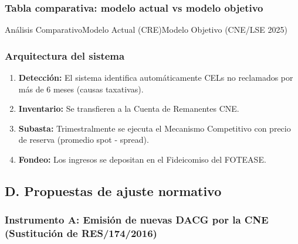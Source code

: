 \documentclass{cel}
\begin{document}
\subsubsection{Tabla comparativa: modelo actual vs modelo objetivo}
\nopagebreak

\vspace{0.3cm}
\begin{tablaParadigmaV2}{Análisis Comparativo}{Modelo Actual (CRE)}{Modelo Objetivo (CNE/LSE 2025)}
\end{tablaParadigmaV2}

\subsubsection{Arquitectura del sistema}
\nopagebreak

\begin{enumerate}
\item \textbf{Detección:} El sistema identifica automáticamente CELs no reclamados por más de 6 meses (causas taxativas).
\item \textbf{Inventario:} Se transfieren a la \textquotedbl{}Cuenta de Remanentes CNE\textquotedbl{}.
\item \textbf{Subasta:} Trimestralmente se ejecuta el Mecanismo Competitivo con precio de reserva (promedio spot - spread).
\item \textbf{Fondeo:} Los ingresos se depositan en el Fideicomiso del FOTEASE.

\end{enumerate}
\subsection{D. Propuestas de ajuste normativo}
\nopagebreak

\subsubsection{Instrumento A: Emisión de nuevas DACG por la CNE (Sustitución de RES/174/2016)}
\nopagebreak
\end{document}
